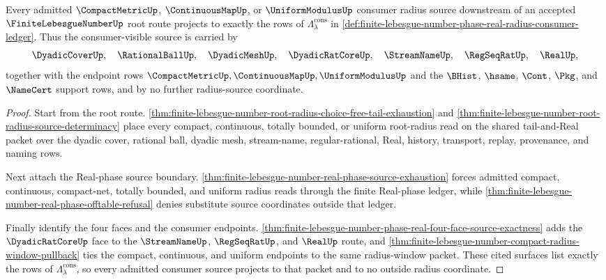 \begin{theorem}
\label{thm:finite-lebesgue-number-phase-real-radius-consumer-carrier}
Every admitted $\CompactMetricUp$, $\ContinuousMapUp$, or $\UniformModulusUp$ consumer radius source downstream of an accepted $\FiniteLebesgueNumberUp$ root route projects to exactly the rows of $\Lambda_{\lambda}^{\mathrm{cons}}$ in \autoref{def:finite-lebesgue-number-phase-real-radius-consumer-ledger}. Thus the consumer-visible source is carried by
$$
\DyadicCoverUp,\quad \RationalBallUp,\quad \DyadicMeshUp,\quad \DyadicRatCoreUp,\quad \StreamNameUp,\quad \RegSeqRatUp,\quad \RealUp,
$$
together with the endpoint rows $\CompactMetricUp,\ContinuousMapUp,\UniformModulusUp$ and the $\BHist$, $\hsame$, $\Cont$, $\Pkg$, and $\NameCert$ support rows, and by no further radius-source coordinate.
\end{theorem}
\begin{proof}
Start from the root route. \autoref{thm:finite-lebesgue-number-root-radius-choice-free-tail-exhaustion} and \autoref{thm:finite-lebesgue-number-root-radius-source-determinacy} place every compact, continuous, totally bounded, or uniform root-radius read on the shared tail-and-Real packet over the dyadic cover, rational ball, dyadic mesh, stream-name, regular-rational, Real, history, transport, replay, provenance, and naming rows.

Next attach the Real-phase source boundary. \autoref{thm:finite-lebesgue-number-real-phase-source-exhaustion} forces admitted compact, continuous, compact-net, totally bounded, and uniform radius reads through the finite Real-phase ledger, while \autoref{thm:finite-lebesgue-number-real-phase-offtable-refusal} denies substitute source coordinates outside that ledger.

Finally identify the four faces and the consumer endpoints. \autoref{thm:finite-lebesgue-number-phase-real-four-face-source-exactness} adds the $\DyadicRatCoreUp$ face to the $\StreamNameUp$, $\RegSeqRatUp$, and $\RealUp$ route, and \autoref{thm:finite-lebesgue-number-compact-radius-window-pullback} ties the compact, continuous, and uniform endpoints to the same radius-window packet. These cited surfaces list exactly the rows of $\Lambda_{\lambda}^{\mathrm{cons}}$, so every admitted consumer source projects to that packet and to no outside radius coordinate.
\end{proof}

